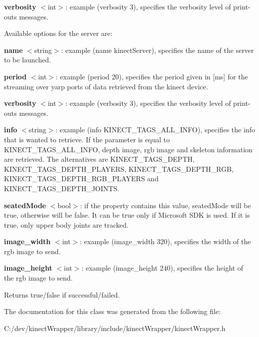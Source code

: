 {\bfseries verbosity} $<$int$>$\+: example (verbosity 3), specifies the verbosity level of print-\/outs messages.

Available options for the server are\+:

{\bfseries name} $<$string$>$\+: example (name kinect\+Server), specifies the name of the server to be launched.

{\bfseries period} $<$int$>$\+: example (period 20), specifies the period given in \mbox{[}ms\mbox{]} for the streaming over yarp ports of data retrieved from the kinect device.

{\bfseries verbosity} $<$int$>$\+: example (verbosity 3), specifies the verbosity level of print-\/outs messages.

{\bfseries info} $<$string$>$\+: example (info K\+I\+N\+E\+C\+T\+\_\+\+T\+A\+G\+S\+\_\+\+A\+L\+L\+\_\+\+I\+N\+F\+O), specifies the info that is wanted to retrieve. If the parameter is equal to K\+I\+N\+E\+C\+T\+\_\+\+T\+A\+G\+S\+\_\+\+A\+L\+L\+\_\+\+I\+N\+F\+O, depth image, rgb image and skeleton information are retrieved. The alternatives are K\+I\+N\+E\+C\+T\+\_\+\+T\+A\+G\+S\+\_\+\+D\+E\+P\+T\+H, K\+I\+N\+E\+C\+T\+\_\+\+T\+A\+G\+S\+\_\+\+D\+E\+P\+T\+H\+\_\+\+P\+L\+A\+Y\+E\+R\+S, K\+I\+N\+E\+C\+T\+\_\+\+T\+A\+G\+S\+\_\+\+D\+E\+P\+T\+H\+\_\+\+R\+G\+B, K\+I\+N\+E\+C\+T\+\_\+\+T\+A\+G\+S\+\_\+\+D\+E\+P\+T\+H\+\_\+\+R\+G\+B\+\_\+\+P\+L\+A\+Y\+E\+R\+S and K\+I\+N\+E\+C\+T\+\_\+\+T\+A\+G\+S\+\_\+\+D\+E\+P\+T\+H\+\_\+\+J\+O\+I\+N\+T\+S.

{\bfseries seated\+Mode} $<$bool$>$\+: if the property contains this value, seated\+Mode will be true, otherwise will be false. It can be true only if Microsoft S\+D\+K is used. If it is true, only upper body joints are tracked.

{\bfseries image\+\_\+width} $<$int$>$\+: example (image\+\_\+width 320), specifies the width of the rgb image to send.

{\bfseries image\+\_\+height} $<$int$>$\+: example (image\+\_\+height 240), specifies the height of the rgb image to send.

\begin{DoxyReturn}{Returns}
true/false if successful/failed. 
\end{DoxyReturn}


The documentation for this class was generated from the following file\+:\begin{DoxyCompactItemize}
\item 
C\+:/dev/kinect\+Wrapper/library/include/kinect\+Wrapper/kinect\+Wrapper.\+h\end{DoxyCompactItemize}
